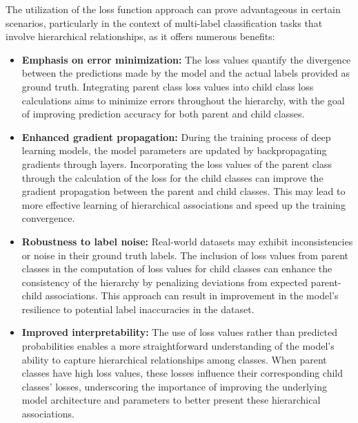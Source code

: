 The utilization of the loss function approach can prove advantageous in certain scenarios, particularly in the context of multi-label classification tasks that involve hierarchical relationships, as it offers numerous benefits:
\begin{itemize}
    \item \textbf{Emphasis on error minimization:} The loss values quantify the divergence between the predictions made by the model and the actual labels provided as ground truth. Integrating parent class loss values into child class loss calculations aims to minimize errors throughout the hierarchy, with the goal of improving prediction accuracy for both parent and child classes.
    \item \textbf{Enhanced gradient propagation:} During the training process of deep learning models, the model parameters are updated by backpropagating gradients through layers. Incorporating the loss values of the parent class through the calculation of the loss for the child classes can improve the gradient propagation between the parent and child classes. This may lead to more effective learning of hierarchical associations and speed up the training convergence.
    \item \textbf{Robustness to label noise:} Real-world datasets may exhibit inconsistencies or noise in their ground truth labels. The inclusion of loss values from parent classes in the computation of loss values for child classes can enhance the consistency of the hierarchy by penalizing deviations from expected parent-child associations. This approach can result in improvement in the model's resilience to potential label inaccuracies in the dataset.
    \item \textbf{Improved interpretability:} The use of loss values rather than predicted probabilities enables a more straightforward understanding of the model's ability to capture hierarchical relationships among classes. When parent classes have high loss values, these losses influence their corresponding child classes' losses, underscoring the importance of improving the underlying model architecture and parameters to better present these hierarchical associations.
\end{itemize}
